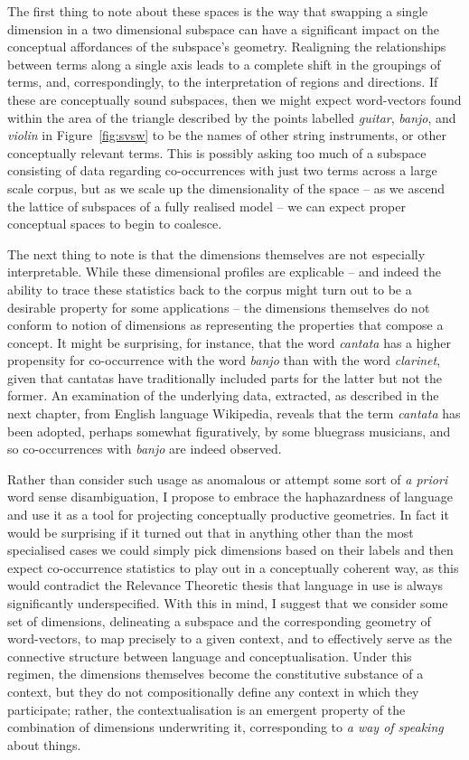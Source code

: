 The first thing to note about these spaces is the way that swapping a single dimension in a two dimensional subspace can have a significant impact on the conceptual affordances of the subspace's geometry.  Realigning the relationships between terms along a single axis leads to a complete shift in the groupings of terms, and, correspondingly, to the interpretation of regions and directions.  If these are conceptually sound subspaces, then we might expect word-vectors found within the area of the triangle described by the points labelled \emph{guitar}, \emph{banjo}, and \emph{violin} in Figure~\ref{fig:svsw} to be the names of other string instruments, or other conceptually relevant terms.  This is possibly asking too much of a subspace consisting of data regarding co-occurrences with just two terms across a large scale corpus, but as we scale up the dimensionality of the space -- as we ascend the lattice of subspaces of a fully realised model -- we can expect proper conceptual spaces to begin to coalesce.

The next thing to note is that the dimensions themselves are not especially interpretable.  While these dimensional profiles are explicable -- and indeed the ability to trace these statistics back to the corpus might turn out to be a desirable property for some applications -- the dimensions themselves do not conform to  notion of dimensions as representing the properties that compose a concept.  It might be surprising, for instance, that the word \emph{cantata} has a higher propensity for co-occurrence with the word \emph{banjo} than with the word \emph{clarinet}, given that cantatas have traditionally included parts for the latter but not the former.  An examination of the underlying data, extracted, as described in the next chapter, from English language Wikipedia, reveals that the term \emph{cantata} has been adopted, perhaps somewhat figuratively, by some bluegrass musicians, and so co-occurrences with \emph{banjo} are indeed observed.

Rather than consider such usage as anomalous or attempt some sort of \emph{a priori} word sense disambiguation, I propose to embrace the haphazardness of language and use it as a tool for projecting conceptually productive geometries.  In fact it would be surprising if it turned out that in anything other than the most specialised cases we could simply pick dimensions based on their labels and then expect co-occurrence statistics to play out in a conceptually coherent way, as this would contradict the Relevance Theoretic thesis that language in use is always significantly underspecified.  With this in mind, I suggest that we consider some set of dimensions, delineating a subspace and the corresponding geometry of word-vectors, to map precisely to a given context, and to effectively serve as the connective structure between language and conceptualisation.  Under this regimen, the dimensions themselves become the constitutive substance of a context, but they do not compositionally define any context in which they participate; rather, the contextualisation is an emergent property of the combination of dimensions underwriting it, corresponding to \emph{a way of speaking} about things.

